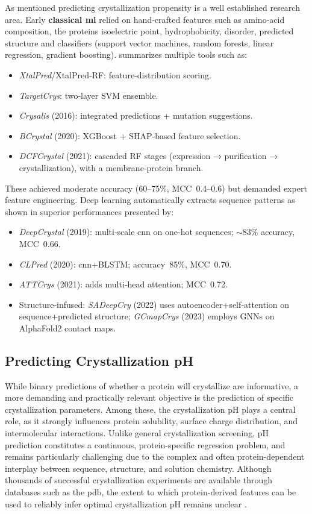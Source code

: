 As mentioned predicting crystallization propensity is a well established research area. Early {\bf classical \gls{ml}} relied on hand‐crafted features such as amino‐acid composition, the proteins isoelectric point, hydrophobicity, disorder, predicted structure and classifiers (support vector machines, random forests, linear regression, gradient boosting). \citet{Matinyan2024} summarizes multiple tools such as: 
\begin{itemize}
	\item {\it XtalPred}/XtalPred‐RF: feature‐distribution scoring.
	\item {\it TargetCrys}: two‐layer SVM ensemble.
	\item {\it Crysalis} (2016): integrated predictions + mutation suggestions.
	\item {\it BCrystal} (2020): XGBoost + SHAP‐based feature selection.
	\item {\it DCFCrystal} (2021): cascaded RF stages (expression → purification → crystallization), with a membrane‐protein branch.
\end{itemize}
These achieved moderate accuracy (60–75\%, MCC~0.4–0.6) but demanded expert feature engineering.
Deep learning automatically extracts sequence patterns as shown in superior performances presented by:
\begin{itemize}
	\item {\it DeepCrystal} (2019): multi‐scale \gls{cnn} on one‐hot sequences; $\sim83\%$ accuracy, MCC~0.66.
	\item {\it CLPred} (2020): \gls{cnn}+BLSTM; accuracy~85\%, MCC~0.70.
	\item {\it ATTCrys} (2021): adds multi‐head attention; MCC~0.72.
	\item Structure‐infused: {\it SADeepCry} (2022) uses autoencoder+self‐attention on sequence+predicted structure; {\it GCmapCrys} (2023) employs GNNs on AlphaFold2 contact maps.
\end{itemize}

\subsection*{Predicting Crystallization pH}
While binary predictions of whether a protein will crystallize are informative, a more demanding and practically relevant objective is the prediction of specific crystallization parameters. Among these, the crystallization pH plays a central role, as it strongly influences protein solubility, surface charge distribution, and intermolecular interactions. Unlike general crystallization screening, pH prediction constitutes a continuous, protein-specific regression problem, and remains particularly challenging due to the complex and often protein-dependent interplay between sequence, structure, and solution chemistry. Although thousands of successful crystallization experiments are available through databases such as the \gls{pdb}, the extent to which protein-derived features can be used to reliably infer optimal crystallization pH remains unclear \citep{Zhang2022}.

